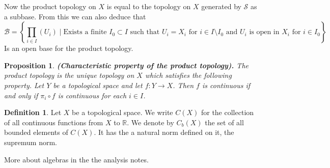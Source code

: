 \documentclass[11pt,a4paper]{article}
\theoremstyle{definition}
\newtheorem{definition}{Definition}[section]
\theoremstyle{plain}
\newtheorem{proposition}[theorem]{Proposition}
\newcommand{\R}{\mathbb{R}}
\newcommand{\set}[2]{ \left\{ #1 \mid #2 \right\} }
\renewcommand{\tt}[1]{\textnormal{\textbf{(#1).}}} %
\begin{document}
	Now the product topology on $X$ is equal to the topology on $X$ generated
	by $\mathcal{S}$ as a subbase. From this we can also deduce that
	\[
		\mathcal{B} = \set{\prod_{i \in I}(U_i)}{\text{Exists a finite
		$I_0 \subset I$ such that $U_i = X_i$ for $i \in I \setminus I_0$ and
		$U_i$ is open in $X_i$ for $i \in I_0$}}
	\]
	Is an open base for the product topology.
	\begin{proposition}
		\tt{Characteristic property of the product topology}
		The product topology is the unique topology on $X$ which satisfies the 
		following property. Let $Y$ be a topological space and let 
		$f \colon Y \to X$. Then $f$ is continuous if and only if 
		$\pi_i \circ f$ is continuous for each $i \in I$.
	\end{proposition}
	\begin{definition}
		Let $X$ be a topological space. We write $C(X)$ for the collection of 
		all continuous functions from $X$ to $\R$. We denote by $C_b(X)$ the set 
		of all bounded elements of $C(X)$. It has the a natural norm defined on
		it, the supremum norm.
	\end{definition}
	More about algebras in the the analysis notes.
	
	\newpage
	
\end{document}
